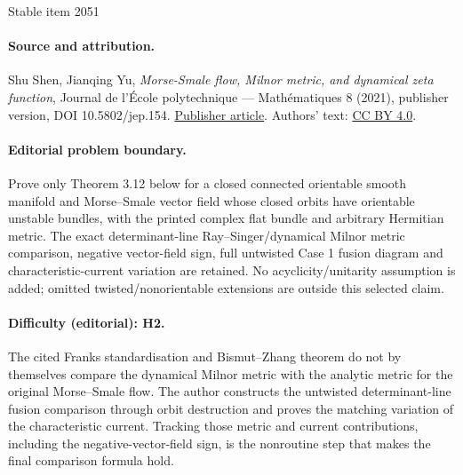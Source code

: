 \documentclass[11pt]{article}
\numberwithin{equation}{section}
\begin{document}
\begin{center}{\Large Stable item 2051}\end{center}
\paragraph{Source and attribution.}
Shu Shen, Jianqing Yu, \emph{Morse-Smale flow, Milnor metric, and dynamical zeta function}, Journal de l’École polytechnique — Mathématiques 8 (2021), publisher version, DOI 10.5802/jep.154. \href{https://jep.centre-mersenne.org/articles/10.5802/jep.154/}{Publisher article}. Authors' text: \href{https://creativecommons.org/licenses/by/4.0/}{CC BY 4.0}.
\paragraph{Editorial problem boundary.}
Prove only Theorem 3.12 below for a closed connected orientable smooth manifold and Morse--Smale vector field whose closed orbits have orientable unstable bundles, with the printed complex flat bundle and arbitrary Hermitian metric. The exact determinant-line Ray--Singer/dynamical Milnor metric comparison, negative vector-field sign, full untwisted Case 1 fusion diagram and characteristic-current variation are retained. No acyclicity/unitarity assumption is added; omitted twisted/nonorientable extensions are outside this selected claim.
\paragraph{Difficulty (editorial): H2.}
The cited Franks standardisation and Bismut--Zhang theorem do not by themselves compare the dynamical Milnor metric with the analytic metric for the original Morse--Smale flow. The author constructs the untwisted determinant-line fusion comparison through orbit destruction and proves the matching variation of the characteristic current. Tracking those metric and current contributions, including the negative-vector-field sign, is the nonroutine step that makes the final comparison formula hold.
\end{document}

